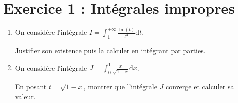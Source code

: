 \documentclass[twoside,french,11pt]{VcCours}
\newcommand{\dx}{\text{d}x}
\newcommand{\dt}{\text{d}t}
\begin{document}
\newpage
\section*{Exercice 1 : Intégrales impropres}
\begin{enumerate}
  \item On considère l'intégrale $I=\int_{1}^{+\infty}\frac{\ln(t)}{t^3}\dt$.
  
  Justifier son existence puis la calculer en intégrant par parties.
  \item On considère l'intégrale $J=\int_{0}^{1}\frac{x}{\sqrt{1-x}}\dx$.
  
  En posant $t=\sqrt{1-x}$, montrer que l'intégrale $J$ converge et calculer sa valeur.

\end{enumerate}
\end{document}
